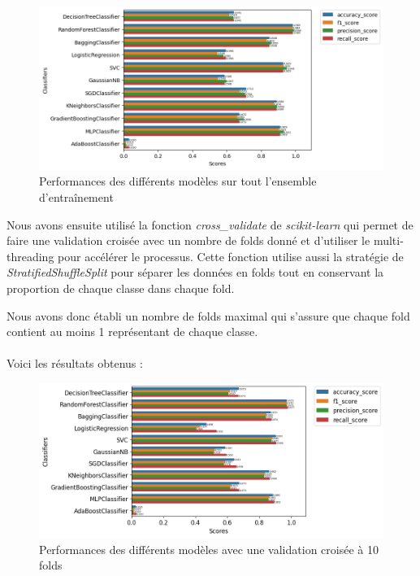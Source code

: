 \documentclass{article}
\begin{document}
\begin{figure}[h]
    \centering
    \includegraphics[width=1.2\textwidth]{img/all_perfs_without_cv.png}
    \caption{Performances des différents modèles sur tout l'ensemble d'entraînement}
\end{figure}

Nous avons ensuite utilisé la fonction \textit{cross\_validate} \cite{CV} de \textit{scikit-learn}
qui permet de faire une validation croisée avec un nombre de folds donné et d'utiliser 
le multi-threading pour accélérer le processus. Cette fonction utilise aussi la 
stratégie de \textit{StratifiedShuffleSplit} \cite{SSS} pour séparer les données en
folds tout en conservant la proportion de chaque classe dans chaque fold.

Nous avons donc établi un nombre de folds maximal qui s'assure que chaque fold 
contient au moins 1 représentant de chaque classe.
\\\\
Voici les résultats obtenus :

\begin{figure}[h]
    \centering
    \includegraphics[width=1.2\textwidth]{img/all_perfs_with_cv.png}
    \caption{Performances des différents modèles avec une validation croisée à 10 folds}
\end{figure}
\end{document}
